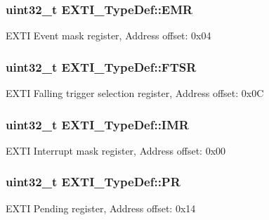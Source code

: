 \subsubsection[{\texorpdfstring{E\+MR}{EMR}}]{ uint32\+\_\+t E\+X\+T\+I\+\_\+\+Type\+Def\+::\+E\+MR}\hypertarget{struct_e_x_t_i___type_def_a9c5bff67bf9499933959df7eb91a1bd6}{}\label{struct_e_x_t_i___type_def_a9c5bff67bf9499933959df7eb91a1bd6}
E\+X\+TI Event mask register, Address offset\+: 0x04 
\subsubsection[{\texorpdfstring{F\+T\+SR}{FTSR}}]{ uint32\+\_\+t E\+X\+T\+I\+\_\+\+Type\+Def\+::\+F\+T\+SR}\hypertarget{struct_e_x_t_i___type_def_aee667dc148250bbf37fdc66dc4a9874d}{}\label{struct_e_x_t_i___type_def_aee667dc148250bbf37fdc66dc4a9874d}
E\+X\+TI Falling trigger selection register, Address offset\+: 0x0C 
\subsubsection[{\texorpdfstring{I\+MR}{IMR}}]{ uint32\+\_\+t E\+X\+T\+I\+\_\+\+Type\+Def\+::\+I\+MR}\hypertarget{struct_e_x_t_i___type_def_a17d061db586d4a5aa646b68495a8e6a4}{}\label{struct_e_x_t_i___type_def_a17d061db586d4a5aa646b68495a8e6a4}
E\+X\+TI Interrupt mask register, Address offset\+: 0x00 
\subsubsection[{\texorpdfstring{PR}{PR}}]{ uint32\+\_\+t E\+X\+T\+I\+\_\+\+Type\+Def\+::\+PR}\hypertarget{struct_e_x_t_i___type_def_a133294b87dbe6a01e8d9584338abc39a}{}\label{struct_e_x_t_i___type_def_a133294b87dbe6a01e8d9584338abc39a}
E\+X\+TI Pending register, Address offset\+: 0x14 
